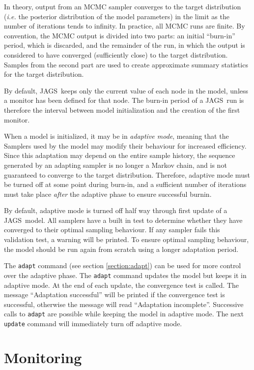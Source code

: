 \documentclass[11pt, a4paper, titlepage]{report}
\newcommand{\JAGS}{\textsf{JAGS}}
\begin{document}
In theory, output from an MCMC sampler converges to the target
distribution ({\em i.e.} the posterior distribution of the model
parameters) in the limit as the number of iterations tends to
infinity. In practice, all MCMC runs are finite.  By convention, the
MCMC output is divided into two parts: an initial ``burn-in'' period,
which is discarded, and the remainder of the run, in which the output
is considered to have converged (sufficiently close) to the target
distribution. Samples from the second part are used to create
approximate summary statistics for the target distribution.

By default, \JAGS\ keeps only the current value of each node in the
model, unless a monitor has been defined for that node. The burn-in
period of a \JAGS\ run is therefore the interval between model
initialization and the creation of the first monitor.

When a model is initialized, it may be in {\em adaptive mode}, meaning
that the Samplers used by the model may modify their behaviour for
increased efficiency. Since this adaptation may depend on the entire
sample history, the sequence generated by an adapting sampler is no
longer a Markov chain, and is not guaranteed to converge to the target
distribution. Therefore, adaptive mode must be turned off at some
point during burn-in, and a sufficient number of iterations must take
place {\em after} the adaptive phase to ensure successful burnin.

By default, adaptive mode is turned off half way through first update
of a \JAGS\ model. All samplers have a built in test to determine
whether they have converged to their optimal sampling behaviour.  If
any sampler fails this validation test, a warning will be printed. To
ensure optimal sampling behaviour, the model should be run again from
scratch using a longer adaptation period.

The \texttt{adapt} command (see section \ref{section:adapt}) can be
used for more control over the adaptive phase.  The \texttt{adapt}
command updates the model but keeps it in adaptive mode. At the end of
each update, the convergence test is called. The message ``Adaptation
successful'' will be printed if the convergence test is successful,
otherwise the message will read ``Adaptation incomplete''.  Successive
calls to \texttt{adapt} are possible while keeping the model in
adaptive mode. The next \texttt{update} command will immediately turn
off adaptive mode.

\section{Monitoring}
\label{section:monitoring}
\end{document}
